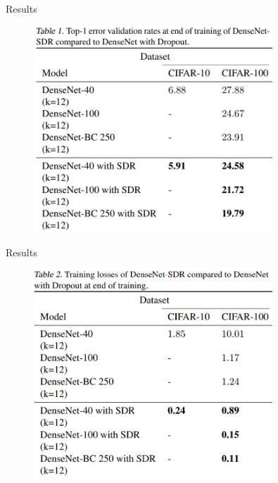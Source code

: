 \documentclass{beamer}
\begin{document}
\begin{frame}{Results}
\begin{figure}[h]
\includegraphics[width=0.8\textwidth]{img/results_val}
\end{figure}
\end{frame}
\begin{frame}{Results}
\begin{figure}[h]
\includegraphics[width=0.8\textwidth]{img/results_train}
\end{figure}
\end{frame}
\end{document}
